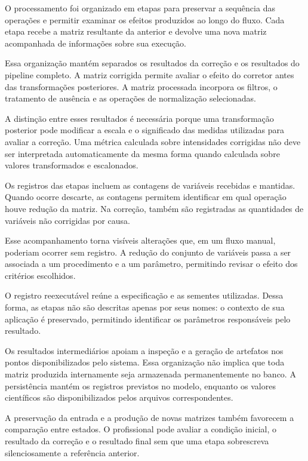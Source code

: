 O processamento foi organizado em etapas para preservar a sequência das operações e permitir examinar os efeitos produzidos ao longo do fluxo. Cada etapa recebe a matriz resultante da anterior e devolve uma nova matriz acompanhada de informações sobre sua execução.

Essa organização mantém separados os resultados da correção e os resultados do pipeline completo. A matriz corrigida permite avaliar o efeito do corretor antes das transformações posteriores. A matriz processada incorpora os filtros, o tratamento de ausência e as operações de normalização selecionadas.

A distinção entre esses resultados é necessária porque uma transformação posterior pode modificar a escala e o significado das medidas utilizadas para avaliar a correção. Uma métrica calculada sobre intensidades corrigidas não deve ser interpretada automaticamente da mesma forma quando calculada sobre valores transformados e escalonados.

Os registros das etapas incluem as contagens de variáveis recebidas e mantidas. Quando ocorre descarte, as contagens permitem identificar em qual operação houve redução da matriz. Na correção, também são registradas as quantidades de variáveis não corrigidas por causa.

Esse acompanhamento torna visíveis alterações que, em um fluxo manual, poderiam ocorrer sem registro. A redução do conjunto de variáveis passa a ser associada a um procedimento e a um parâmetro, permitindo revisar o efeito dos critérios escolhidos.

O registro reexecutável reúne a especificação e as sementes utilizadas. Dessa forma, as etapas não são descritas apenas por seus nomes: o contexto de sua aplicação é preservado, permitindo identificar os parâmetros responsáveis pelo resultado.

Os resultados intermediários apoiam a inspeção e a geração de artefatos nos pontos disponibilizados pelo sistema. Essa organização não implica que toda matriz produzida internamente seja armazenada permanentemente no banco. A persistência mantém os registros previstos no modelo, enquanto os valores científicos são disponibilizados pelos arquivos correspondentes.

A preservação da entrada e a produção de novas matrizes também favorecem a comparação entre estados. O profissional pode avaliar a condição inicial, o resultado da correção e o resultado final sem que uma etapa sobrescreva silenciosamente a referência anterior.

